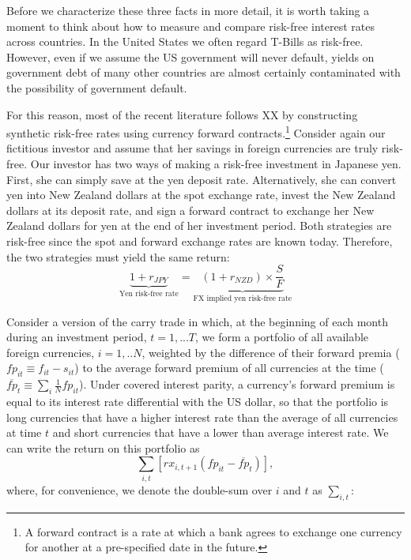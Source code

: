 \documentclass{ar-1col}
\begin{document}
Before we characterize these three facts in more detail, it is worth taking a moment to think about how to measure and compare risk-free interest rates across countries. In the United States we often regard T-Bills as risk-free. However, even if we assume the US government will never default, yields on government debt of many other countries are almost certainly contaminated with the possibility of government default.

For this reason, most of the recent literature follows XX by constructing synthetic risk-free rates using currency
forward contracts.\footnote{A forward contract is a rate 
at which a bank agrees to exchange one currency for another at a
pre-specified date in the future.} Consider again our fictitious investor 
and assume that her savings in foreign currencies are truly risk-free. 
Our investor has two ways of making a risk-free investment in Japanese 
yen. First, she can simply save at the yen deposit rate. Alternatively, 
she can convert yen into New Zealand dollars at the spot exchange 
rate, invest the New Zealand dollars at its deposit rate, and sign a 
forward contract to exchange her New Zealand dollars for yen at the 
end of her investment period. Both strategies are risk-free
since the spot and forward exchange rates are known today. Therefore, 
the two strategies must yield the same return:
\begin{equation*}
    \underbrace{1 + r_{JPY}}_{\text{Yen risk-free rate}}
    = \underbrace{
    (1 + r_{NZD}) \times \frac{S}{F}
    }_{\text{FX implied yen risk-free rate}}
\end{equation*}



Consider a version of the carry
trade in which, at the beginning of each month during an investment period, $t=1,...T$, we form a
portfolio of all available foreign currencies, $i=1,..N$, weighted by the
difference of their forward premia ($fp_{it}\equiv f_{it}-s_{it}$) to the
average forward premium of all currencies at the time ($\overline{fp}_{t}\equiv \sum_{i}%
\frac{1}{N}fp_{it}$). Under covered interest parity, a currency's forward
premium is equal to its interest rate differential with the US dollar, so
that the portfolio is long currencies that have a higher interest rate than
the average of all currencies at time $t$ and short currencies that have a
lower than average interest rate. We can write the return on this portfolio
as
\begin{equation}
\textstyle\sum_{i,t}\left[ rx_{i,t+1}\left( fp_{it}-\overline{fp}_{t}\right) \right] ,
\label{eq_CT}
\end{equation}%
where, for convenience, we denote the double-sum over $i$ and $t$ as $%
\textstyle\sum_{i,t}$:
\end{document}
